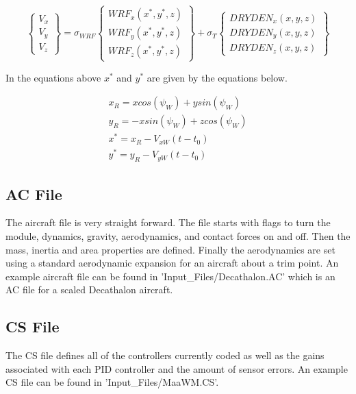 \documentclass[letterpaper]{article}
\begin{document}
\begin{equation}
\begin{Bmatrix} V_x \\ V_y \\ V_z \end{Bmatrix} = \sigma_{WRF} \begin{Bmatrix}
  WRF_x(x^*,y^*,z) \\ WRF_y(x^*,y^*,z)
  \\ WRF_z(x^*,y^*,z) \end{Bmatrix} + \sigma_{T} \begin{Bmatrix}
  DRYDEN_x(x,y,z) \\ DRYDEN_y(x,y,z) \\ DRYDEN_z(x,y,z) \end{Bmatrix}
\end{equation}

In the equations above $x^*$ and $y^*$ are given by the equations
below.

\begin{equation}
\begin{matrix}
x_R = x cos(\psi_W) + y sin(\psi_W) \\
y_R = -x sin(\psi_W) + z cos(\psi_W) \\
x^* = x_R - V_{xW}(t-t_0)\\
y^* = y_R - V_{yW}(t-t_0)
\end{matrix}
\end{equation}

\subsection{AC File}

The aircraft file is very straight forward. The file starts with flags
to turn the module, dynamics, gravity, aerodynamics, and contact
forces on and off. Then the mass, inertia and area properties are
defined. Finally the aerodynamics are set using a standard
aerodynamic expansion for an aircraft about a trim point. An example
aircraft file can be found in 'Input\_Files/Decathalon.AC' which is an
AC file for a scaled Decathalon aircraft.

\subsection{CS File}

The CS file defines all of the controllers currently coded as well as
the gains associated with each PID controller and the amount of sensor
errors. An example CS file can be found in
'Input\_Files/MaaWM.CS'. 
\end{document}
